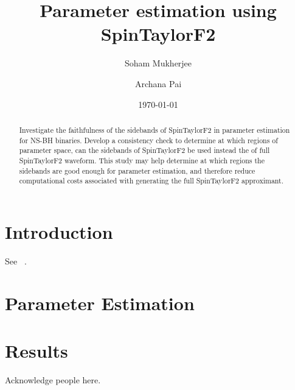 \documentclass[nofootinbib,preprintnumbers,superscriptaddress,notitlepage]{revtex4-1}
\newcommand{\<}{\begin{equation}}
\newcommand{\?}{\end{equation}}
\begin{document}
\title{Parameter estimation using SpinTaylorF2}

\author{Soham Mukherjee}
\author{Archana Pai}
\date{\today}

\begin{abstract}
Investigate the faithfulness of the sidebands of SpinTaylorF2 
in parameter estimation for NS-BH binaries. Develop a consistency 
check to determine at which regions of parameter space, can the 
sidebands of SpinTaylorF2 be used instead the of full SpinTaylorF2 
waveform. This study may help determine at which regions the sidebands
are good enough for parameter estimation, and therefore reduce
computational costs associated with generating the full SpinTaylorF2 
approximant.
 
\end{abstract}

\maketitle

\section{Introduction}

See ~\cite{Lundgren2014}.

\section{Parameter Estimation}

\section{Results}


\acknowledgments

Acknowledge people here.


\end{document}
